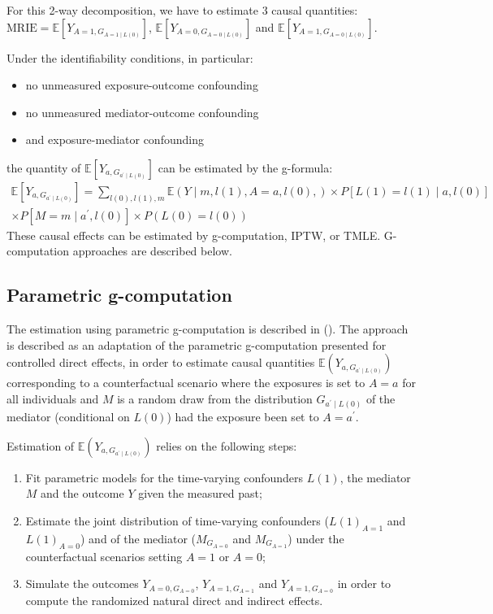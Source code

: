 \documentclass[
]{book}
\providecommand{\tightlist}{%
  \setlength{\itemsep}{0pt}\setlength{\parskip}{0pt}}
\begin{document}
For this 2-way decomposition, we have to estimate 3 causal quantities: \(\text{MRIE}=\mathbb{E}\left[Y_{A=1,G_{A=1\mid L(0)}} \right]\), \(\mathbb{E}\left[ Y_{A=0,G_{A=0\mid L(0)}} \right]\) and \(\mathbb{E}\left[ Y_{A=1,G_{A=0\mid L(0)}} \right]\).

Under the identifiability conditions, in particular:

\begin{itemize}
\tightlist
\item
  no unmeasured exposure-outcome confounding
\item
  no unmeasured mediator-outcome confounding
\item
  and exposure-mediator confounding
\end{itemize}

the quantity of \(\mathbb{E}\left[Y_{a,G_{a^\prime\mid L(0)}} \right]\) can be estimated by the g-formula:
\begin{multline*}
\mathbb{E}\left[Y_{a,G_{a^\prime\mid L(0)}} \right]=\sum_{l(0),l(1),m} \mathbb{E}\left(Y \mid m,l(1),A=a,l(0),\right) \times P[L(1)=l(1) \mid a,l(0)] \\
  \times P[M=m \mid a^\prime, l(0)] \times P(L(0)=l(0))
\end{multline*}
These causal effects can be estimated by g-computation, IPTW, or TMLE. G-computation approaches are described below.

\subsection{Parametric g-computation}\label{parametric-g-computation}

The estimation using parametric g-computation is described in (). The approach is described as an adaptation of the parametric g-computation presented for controlled direct effects, in order to estimate causal quantities \(\mathbb{E}(Y_{a,G_{a^\prime\mid L(0)}})\) corresponding to a counterfactual scenario where the exposures is set to \(A=a\) for all individuals and \(M\) is a random draw from the distribution \(G_{a^\prime \mid L(0)}\) of the mediator (conditional on \(L(0)\)) had the exposure been set to \(A=a^\prime\).

Estimation of \(\mathbb{E}(Y_{a,G_{a^\prime\mid L(0)}})\) relies on the following steps:

\begin{enumerate}
\def\labelenumi{\arabic{enumi}.}
\item
  Fit parametric models for the time-varying confounders \(L(1)\), the mediator \(M\) and the outcome \(Y\) given the measured past;
\item
  Estimate the joint distribution of time-varying confounders (\(L(1)_{A=1}\) and \(L(1)_{A=0}\)) and of the mediator (\(M_{G_{A=0}}\) and \(M_{G_{A=1}}\)) under the counterfactual scenarios setting \(A = 1\) or \(A=0\);
\item
  Simulate the outcomes \(Y_{A=0,G_{A=0}}\), \(Y_{A=1,G_{A=1}}\) and \(Y_{A=1,G_{A=0}}\) in order to compute the randomized natural direct and indirect effects.
\end{enumerate}
\end{document}
